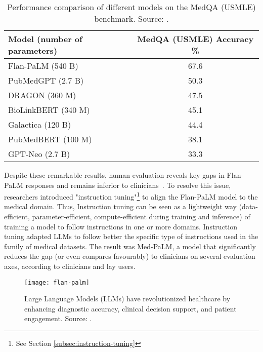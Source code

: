\begin{table}[!h]
	\centering
	\begin{tabular}{@{}lc@{}}
		\toprule
		Model (number of parameters) & MedQA (USMLE) Accuracy \% \\
		\midrule
		Flan-PaLM (540 B)            & 67.6                      \\
		PubMedGPT (2.7 B)            & 50.3                      \\
		DRAGON (360 M)               & 47.5                      \\
		BioLinkBERT (340 M)          & 45.1                      \\
		Galactica (120 B)            & 44.4                      \\
		PubMedBERT (100 M)           & 38.1                      \\
		GPT-Neo (2.7 B)              & 33.3                      \\
		\bottomrule
	\end{tabular}
	\caption{Performance comparison of different models on the MedQA (USMLE) benchmark. Source: \protect\textcite{singhal2022large}.}
	\label{tab:medqa_performance}
\end{table}

Despite these remarkable results, human evaluation reveals key gaps in Flan-PaLM responses and remains inferior to clinicians~\cite{singhal2022large}.
To resolve this issue, researchers introduced "instruction tuning"\footnote{See Section \ref{subsec:instruction-tuning}} to align the Flan-PaLM model to the medical domain.
Thus, Instruction tuning can be seen as a lightweight way (data-efficient, parameter-efficient, compute-efficient during training and inference) of training a model to follow instructions in one or more domains.
Instruction tuning adapted LLMs to follow better the specific type of instructions used in the family of medical datasets.
The result was Med-PaLM, a model that significantly reduces the gap (or even compares favourably) to clinicians on several evaluation axes, according to clinicians and lay users.

\begin{figure}[h!]
	\centering
	\texttt{[image: flan-palm]}
	\caption{Large Language Models (LLMs) have revolutionized healthcare by enhancing diagnostic accuracy, clinical decision support, and patient engagement. Source: \protect\textcite{singhal2022large}.}
	\label{fig:llm-healthcare}
\end{figure}

